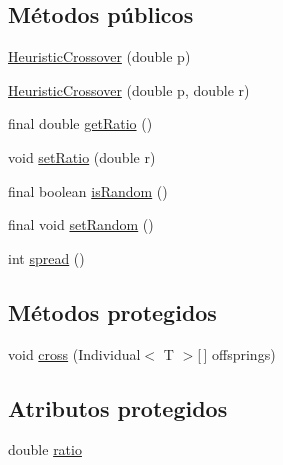 \subsection*{Métodos públicos}
\begin{DoxyCompactItemize}
\item 
\hyperlink{classjenes_1_1stage_1_1operator_1_1common_1_1_heuristic_crossover_3_01_t_01extends_01_double_chromosome_01_4_ab1d3d3ec4281a97824e9859fddfba792}{Heuristic\-Crossover} (double p)
\item 
\hyperlink{classjenes_1_1stage_1_1operator_1_1common_1_1_heuristic_crossover_3_01_t_01extends_01_double_chromosome_01_4_a45df3b701ffb650f013d3b65753f4ffa}{Heuristic\-Crossover} (double p, double r)
\item 
final double \hyperlink{classjenes_1_1stage_1_1operator_1_1common_1_1_heuristic_crossover_3_01_t_01extends_01_double_chromosome_01_4_acab7758424b5132b15579fff5da094d5}{get\-Ratio} ()
\item 
void \hyperlink{classjenes_1_1stage_1_1operator_1_1common_1_1_heuristic_crossover_3_01_t_01extends_01_double_chromosome_01_4_adec77409f57afee4170cacb806e7254c}{set\-Ratio} (double r)
\item 
final boolean \hyperlink{classjenes_1_1stage_1_1operator_1_1common_1_1_heuristic_crossover_3_01_t_01extends_01_double_chromosome_01_4_ab965521456ce0233197659c9eb7f0e16}{is\-Random} ()
\item 
final void \hyperlink{classjenes_1_1stage_1_1operator_1_1common_1_1_heuristic_crossover_3_01_t_01extends_01_double_chromosome_01_4_ad3c86ba10d567679be7750185c955ef2}{set\-Random} ()
\item 
int \hyperlink{classjenes_1_1stage_1_1operator_1_1common_1_1_heuristic_crossover_3_01_t_01extends_01_double_chromosome_01_4_aa2443a20ee35492f91c021f0b369354d}{spread} ()
\end{DoxyCompactItemize}
\subsection*{Métodos protegidos}
\begin{DoxyCompactItemize}
\item 
void \hyperlink{classjenes_1_1stage_1_1operator_1_1common_1_1_heuristic_crossover_3_01_t_01extends_01_double_chromosome_01_4_aeb3cbe441f2588644e5129d7501c90ed}{cross} (Individual$<$ T $>$\mbox{[}$\,$\mbox{]} offsprings)
\end{DoxyCompactItemize}
\subsection*{Atributos protegidos}
\begin{DoxyCompactItemize}
\item 
double \hyperlink{classjenes_1_1stage_1_1operator_1_1common_1_1_heuristic_crossover_3_01_t_01extends_01_double_chromosome_01_4_a9cae7cf20e3154743a4dbe53054f513b}{ratio}
\end{DoxyCompactItemize}


